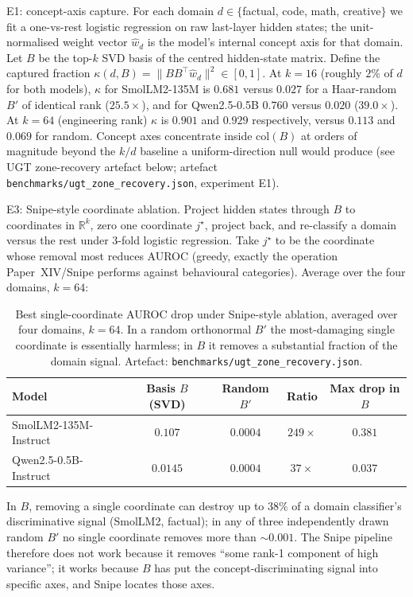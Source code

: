 \documentclass[11pt]{article}
\begin{document}
E1: concept-axis capture.
For each domain $d \in \{$factual, code, math, creative$\}$ we fit a
one-vs-rest logistic regression on raw last-layer hidden states; the
unit-normalised weight vector $\hat w_d$ is the model's internal
concept axis for that domain.  Let $B$ be the top-$k$ SVD basis
of the centred hidden-state matrix.  Define the captured fraction
$\kappa(d, B) = \|B B^\top \hat w_d\|^2 \in [0,1]$.  At $k{=}16$
(roughly $2\%$ of $d$ for both models),
$\kappa$ for SmolLM2-135M is $0.681$ versus $0.027$ for a Haar-random
$B'$ of identical rank ($25.5\times$), and for Qwen2.5-0.5B
$0.760$ versus $0.020$ ($39.0\times$).  At $k{=}64$ (engineering rank)
$\kappa$ is $0.901$ and $0.929$ respectively, versus
$0.113$ and $0.069$ for random.  Concept axes
concentrate inside $\mathrm{col}(B)$ at orders of magnitude beyond the
$k/d$ baseline a uniform-direction null would produce
(see UGT zone-recovery artefact below; artefact
\texttt{benchmarks/ugt\_zone\_recovery.json}, experiment E1).

E3: Snipe-style coordinate ablation.
Project hidden states through $B$ to coordinates in $\mathbb{R}^k$,
zero one coordinate $j^\star$, project back, and re-classify a domain
versus the rest under 3-fold logistic regression.  Take $j^\star$ to
be the coordinate whose removal most reduces AUROC (greedy, exactly
the operation Paper~XIV/Snipe performs against behavioural categories).
Average over the four domains, $k{=}64$:

\begin{table}[ht]
\centering
\caption{Best single-coordinate AUROC drop under Snipe-style ablation,
averaged over four domains, $k{=}64$.  In a random orthonormal $B'$
the most-damaging single coordinate is essentially harmless; in $B$
it removes a substantial fraction of the domain signal.  Artefact:
\texttt{benchmarks/ugt\_zone\_recovery.json}.}
\label{tab:ugt-snipe-coord}
\begin{tabular}{lcccc}
\toprule
Model & Basis $B$ (SVD) & Random $B'$ & Ratio & Max drop in $B$ \\
\midrule
SmolLM2-135M-Instruct & $0.107$ & $0.0004$ & $249\times$ & $0.381$ \\
Qwen2.5-0.5B-Instruct & $0.0145$ & $0.0004$ & $37\times$ & $0.037$ \\
\bottomrule
\end{tabular}
\end{table}

In $B$, removing a single coordinate can destroy up to $38\%$ of a
domain classifier's discriminative signal (SmolLM2, factual);
in any of three independently drawn random $B'$ no single coordinate
removes more than $\sim 0.001$.  The Snipe pipeline therefore does
not work because it removes ``some rank-1 component of high
variance''; it works because $B$ has put the concept-discriminating
signal into specific axes, and Snipe locates those axes.
\end{document}
